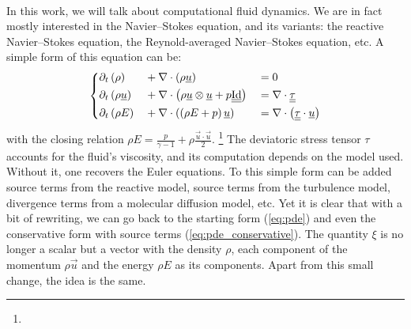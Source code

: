     \paragraph{}
    In this work, we will talk about computational fluid dynamics.
    We are in fact mostly interested in the Navier--Stokes equation, and its variants: the reactive Navier--Stokes equation, the Reynold-averaged Navier--Stokes equation, etc.
    A simple form of this equation can be:
    \begin{equation}\label{eq:ns}
      \left\{\begin{aligned}
        &\partial_t\left(\rho         \right) &&+ \nabla\cdot\left( \rho \underline{u} \right) &&= 0 \\
        &\partial_t\left(\rho \underline{u} \right) &&+ \nabla\cdot\left( \rho \underline{u} \otimes \underline{u} + p \underline{\underline{\operatorname{Id}}} \right) &&= \nabla\cdot \underline{\underline{\tau}}\\
        &\partial_t\left( \rho E      \right) &&+ \nabla\cdot\left( \left(\rho E + p\right) \underline{u} \right) &&=
          \nabla\cdot\left( \underline{\underline{\tau}} \cdot \underline{u} \right)
      \end{aligned}\right.
    \end{equation}
    with the closing relation $\rho E = \frac{p}{\gamma - 1} + \rho\frac{\vec{u} \cdot \vec{u}}{2}$.
    \footnote{}
    The deviatoric stress tensor $\tau$ accounts for the fluid's viscosity, and its computation depends on the model used.
    Without it, one recovers the Euler equations.
    To this simple form can be added source terms from the reactive model, source terms from the turbulence model, divergence terms from a molecular diffusion model, etc.
    Yet it is clear that with a bit of rewriting, we can go back to the starting form (\ref{eq:pde}) and even the conservative form with source terms (\ref{eq:pde_conservative}).
    The quantity $\xi$ is no longer a scalar but a vector with the density $\rho$, each component of the momentum $\rho\vec{u}$ and the energy $\rho E$ as its components.
    Apart from this small change, the idea is the same.

